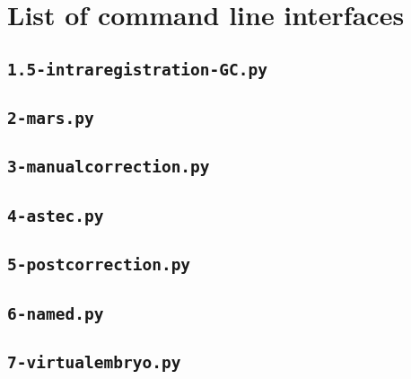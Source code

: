 \section{List of command line interfaces}

%
%


%
%
%


\subsection{\texttt{1.5-intraregistration-GC.py}}


\subsection{\texttt{2-mars.py}}

\subsection{\texttt{3-manualcorrection.py}}

\subsection{\texttt{4-astec.py}}

\subsection{\texttt{5-postcorrection.py}}

\subsection{\texttt{6-named.py}}

\subsection{\texttt{7-virtualembryo.py}}




